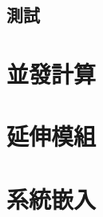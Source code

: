 \documentclass[a4paper,12pt]{book}
\theoremstyle{definition}
\begin{document}
\section{測試}

\chapter{並發計算}
%
\label{c:concurrency}

\chapter{延伸模組}
%
\label{c:extension}

\chapter{系統嵌入}
%
\label{c:embed}

\backmatter



\end{document}
